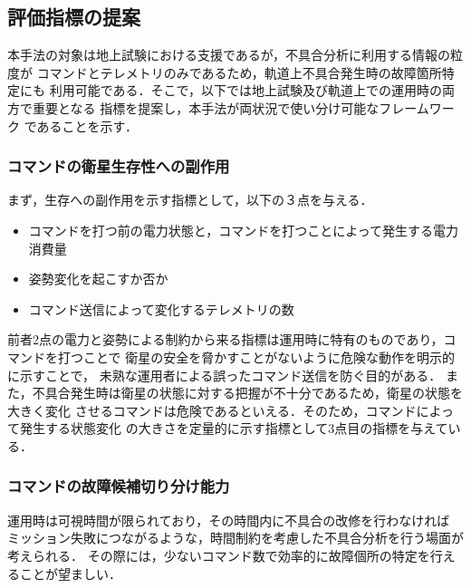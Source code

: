 \documentclass[11pt]{jsarticle}%
\begin{document}
\begin{multicols}{2}
\vspace{-1zh}
\subsection{評価指標の提案}
本手法の対象は地上試験における支援であるが，不具合分析に利用する情報の粒度が
コマンドとテレメトリのみであるため，軌道上不具合発生時の故障箇所特定にも
利用可能である．そこで，以下では地上試験及び軌道上での運用時の両方で重要となる
指標を提案し，本手法が両状況で使い分け可能なフレームワーク%
であることを示す．
\vspace{-1zh}
  \subsubsection{コマンドの衛星生存性への副作用}
  まず，生存への副作用を示す指標として，以下の３点を与える．
  \begin{itemize}
    \item コマンドを打つ前の電力状態と，コマンドを打つことによって発生する電力消費量
    \item 姿勢変化を起こすか否か
    \item コマンド送信によって変化するテレメトリの数
  \end{itemize}
  前者2点の電力と姿勢による制約から来る指標は運用時に特有のものであり，コマンドを打つことで
  衛星の安全を脅かすことがないように危険な動作を明示的に示すことで，
  未熟な運用者による誤ったコマンド送信を防ぐ目的がある．
  また，不具合発生時は衛星の状態に対する把握が不十分であるため，衛星の状態を大きく変化
  させるコマンドは危険であるといえる．そのため，コマンドによって発生する状態変化
  の大きさを定量的に示す指標として3点目の指標を与えている．
\vspace{-1zh}
\subsubsection{コマンドの故障候補切り分け能力}
  運用時は可視時間が限られており，その時間内に不具合の改修を行わなければ
  ミッション失敗につながるような，時間制約を考慮した不具合分析を行う場面が考えられる．
  その際には，少ないコマンド数で効率的に故障個所の特定を行えることが望ましい．


\end{multicols}
\end{document}
